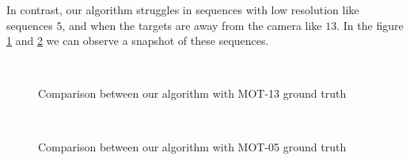 In contrast, our algorithm struggles in sequences with low resolution like sequences $5$, and when the targets are away from the camera like $13$. In the figure \ref{seq3} and \ref{seq4} we can observe a snapshot of these sequences.


\begin{figure}[H]
		
\centering

\\
\caption{Comparison between our algorithm with MOT-13 ground truth}
\label{seq3}
\end{figure}


\begin{figure}[H]
		
\centering

\\
\caption{Comparison between our algorithm with MOT-05 ground truth}
\label{seq4}
\end{figure}



